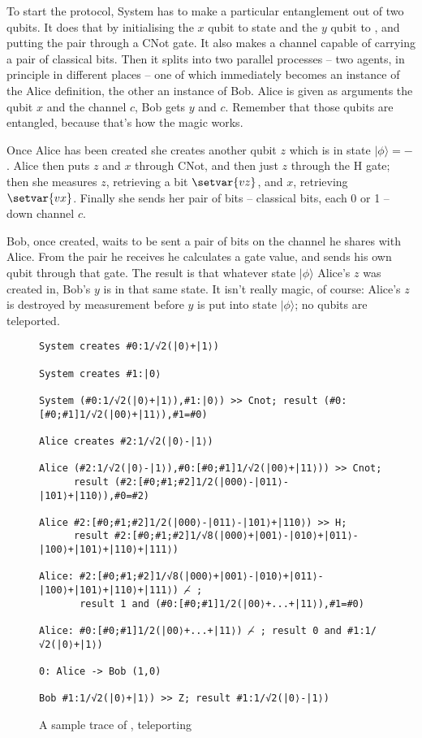 \documentclass[11pt,a4paper]{article}
\begin{document}
To start the protocol, System has to make a particular entanglement out of two qubits. It does that by initialising the $x$ qubit to state \zero{} and the $y$ qubit to \plus, and putting the pair through a CNot gate. It also makes a channel capable of carrying a pair of classical bits. Then it splits into two parallel processes -- two agents, in principle in different places -- one of which immediately becomes an instance of the Alice definition, the other an instance of Bob. Alice is given as arguments the qubit $x$ and the channel $c$, Bob gets $y$ and $c$. Remember that those qubits are entangled, because that's how the magic works.

Once Alice has been created she creates another qubit $z$ which is in state $|\phi\rangle=\minus$. Alice then puts $z$ and $x$ through CNot, and then just $z$ through the H gate; then she measures $z$, retrieving a bit $\setvar{vz}$, and $x$, retrieving $\setvar{vx}$. Finally she sends her pair of bits -- classical bits, each 0 or 1 -- down channel $c$.

Bob, once created, waits to be sent a pair of bits on the channel he shares with Alice. From the pair he receives he calculates a gate value, and sends his own qubit through that gate. The result is that whatever state $|\phi\rangle$ Alice's $z$ was created in, Bob's $y$ is in that same state. It isn't really magic, of course: Alice's $z$ is destroyed by measurement before $y$ is put into state $|\phi\rangle$; no qubits are teleported. 

\begin{figure}
\centering
\begin{verbatim}
System creates #0:1/√2(|0⟩+|1⟩)

System creates #1:|0⟩

System (#0:1/√2(|0⟩+|1⟩),#1:|0⟩) >> Cnot; result (#0:[#0;#1]1/√2(|00⟩+|11⟩),#1=#0)

Alice creates #2:1/√2(|0⟩-|1⟩)

Alice (#2:1/√2(|0⟩-|1⟩),#0:[#0;#1]1/√2(|00⟩+|11⟩)) >> Cnot; 
      result (#2:[#0;#1;#2]1/2(|000⟩-|011⟩-|101⟩+|110⟩),#0=#2)

Alice #2:[#0;#1;#2]1/2(|000⟩-|011⟩-|101⟩+|110⟩) >> H; 
      result #2:[#0;#1;#2]1/√8(|000⟩+|001⟩-|010⟩+|011⟩-|100⟩+|101⟩+|110⟩+|111⟩)

Alice: #2:[#0;#1;#2]1/√8(|000⟩+|001⟩-|010⟩+|011⟩-|100⟩+|101⟩+|110⟩+|111⟩) ⌢̸ ; 
       result 1 and (#0:[#0;#1]1/2(|00⟩+...+|11⟩),#1=#0)

Alice: #0:[#0;#1]1/2(|00⟩+...+|11⟩) ⌢̸ ; result 0 and #1:1/√2(|0⟩+|1⟩)

0: Alice -> Bob (1,0)

Bob #1:1/√2(|0⟩+|1⟩) >> Z; result #1:1/√2(|0⟩-|1⟩)
\end{verbatim}
\caption{A sample trace of , teleporting \minus}
\end{figure}
\end{document}
